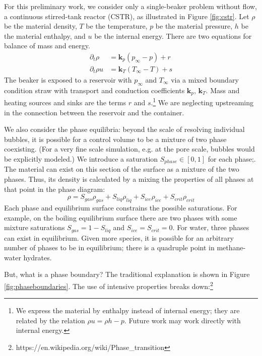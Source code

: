 \documentclass[]{article}
\begin{document}
For this preliminary work, we consider only a single-beaker problem
without flow, a continuous stirred-tank reactor (CSTR), as illustrated
in Figure \ref{fig:cstr}. Let \(\rho\) be the material density, \(T\) be the
temperature, \(p\) be the material pressure, \(h\) be the material
enthalpy, and \(u\) be the internal energy. There are two equations for
balance of mass and energy.
\begin{align}
\partial_t \rho & = \mathbf{k}_p(p_\infty - p) + r\\
\partial_t \rho u & = \mathbf{k}_T(T_\infty-T) + s 
\end{align}
The beaker is exposed to a reservoir with \(p_\infty\) and \(T_\infty\)
via a mixed boundary condition straw with transport and conduction
coefficients \(\mathbf{k}_p\), \(\mathbf{k}_T\). Mass and heating
sources and sinks are the terms \(r\) and \(s\).\footnote{We express the
  material by enthalpy instead of internal energy; they are related by
  the relation \(\rho u = \rho h - p\). Future work may work directly
  with internal energy.}
We are neglecting upstreaming in the connection between the reservoir
and the container.

We also consider the phase equilibria: beyond the scale of resolving
individual bubbles, it is possible
for a control volume to be a mixture of two phase coexisting.
(For a very fine scale simulation, e.g. at the pore scale, bubbles
would be explicitly modeled.)
We introduce a saturation $S_{phase}\in[0,1]$ for each phase;.
The material can exist on this section of the surface as a mixture of
the two phases. Thus, its density is calculated by a mixing the
properties of all phases at that point in the phase diagram:
\begin{equation}
  \rho = S_{gas} \rho_{gas} + S_{liq} \rho_{liq} + S_{ice}
    \rho_{ice} + S_{crit} \rho_{crit}
  \end{equation}
Each phase
and equilibrium surface constrains the possible saturations. For example, on the boiling equilibrium surface there are two phases with some mixture
saturations \(S_{gas}=1-S_{liq}\) and $S_{ice}=S_{crit}=0$. 
For water, three phases can exist in equilibrium. Given more species, it is possible for an arbitrary number of phases
to be in equilibrium; there is a quadruple point in methane-water
hydrates.

But, what is a phase boundary? The traditional explanation is shown in
Figure \ref{fig:phaseboundaries}. The use of intensive properties breaks down:\footnote{https://en.wikipedia.org/wiki/Phase\_transition}
\end{document}
